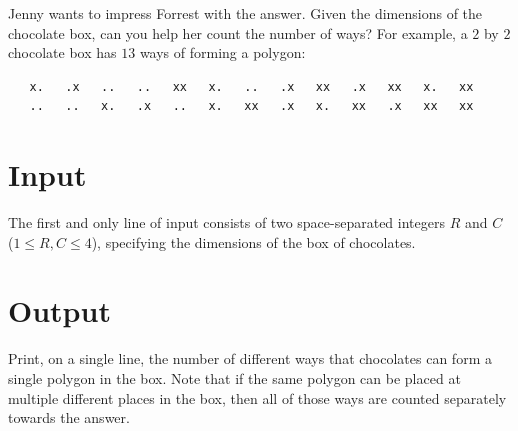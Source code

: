 Jenny wants to impress Forrest with the answer. Given the dimensions of the chocolate box, can you help her count the number of ways? For example, a $2$ by $2$ chocolate box has $13$ ways of forming a polygon:
\begin{verbatim}
   x.   .x   ..   ..   xx   x.   ..   .x   xx   .x   xx   x.   xx
   ..   ..   x.   .x   ..   x.   xx   .x   x.   xx   .x   xx   xx
\end{verbatim}

\section*{Input}
The first and only line of input consists of two space-separated integers $R$ and $C$ ($1 \leq R, C \leq 4$), specifying the dimensions of the box of chocolates.

\section*{Output}
Print, on a single line, the number of different ways that chocolates can form a single polygon in the box. Note that if the same polygon can be placed at multiple different places in the box, then all of those ways are counted separately towards the answer.\\
